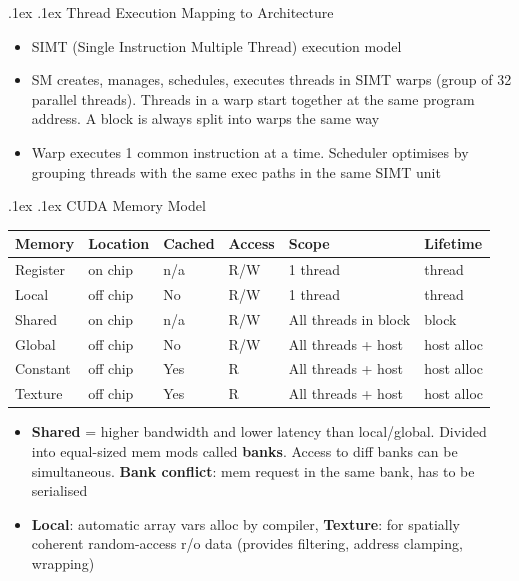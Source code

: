 \documentclass[10pt,landscape,a4paper]{article}
\makeatletter
\renewcommand{\subsection}{\@startsection{subsection}{1}{0mm}%
  {.1ex}%
  {.1ex}%
{\sffamily\bfseries}}
\makeatother
\begin{document}
\begin{multicols*}{4}
  \subsection{Thread Execution Mapping to Architecture}
  \begin{itemize}
    \item SIMT (Single Instruction Multiple Thread) execution model
    \item SM creates, manages, schedules, executes threads in SIMT warps (group of 32 parallel threads). Threads in a warp start together at the same program address. A block is always split into warps the same way
    \item Warp executes 1 common instruction at a time. Scheduler optimises by grouping threads with the same exec paths in the same SIMT unit
  \end{itemize}
  \subsection{CUDA Memory Model}
  \begin{tabularx}{\columnwidth}{l|l|l|l|l|l}
    \textbf{Memory} & \textbf{Location} & \textbf{Cached} & \textbf{Access} & \textbf{Scope}       & \textbf{Lifetime} \\ \hline
    Register        & on chip           & n/a             & R/W             & 1 thread             & thread            \\ \hline
    Local           & off chip          & No              & R/W             & 1 thread             & thread            \\ \hline
    Shared          & on chip           & n/a             & R/W             & All threads in block & block             \\ \hline
    Global          & off chip          & No              & R/W             & All threads + host   & host alloc        \\ \hline
    Constant        & off chip          & Yes             & R               & All threads + host   & host alloc        \\ \hline
    Texture         & off chip          & Yes             & R               & All threads + host   & host alloc        \\
  \end{tabularx}
  \begin{itemize}
    \item \textbf{Shared} = higher bandwidth and lower latency than local/global. Divided into equal-sized mem mods called \textbf{banks}. Access to diff banks can be simultaneous. \textbf{Bank conflict}: mem request in the same bank, has to be serialised
    \item \textbf{Local}: automatic array vars alloc by compiler, \textbf{Texture}: for spatially coherent random-access r/o data (provides filtering, address clamping, wrapping)
  \end{itemize}

\end{multicols*}
\end{document}
